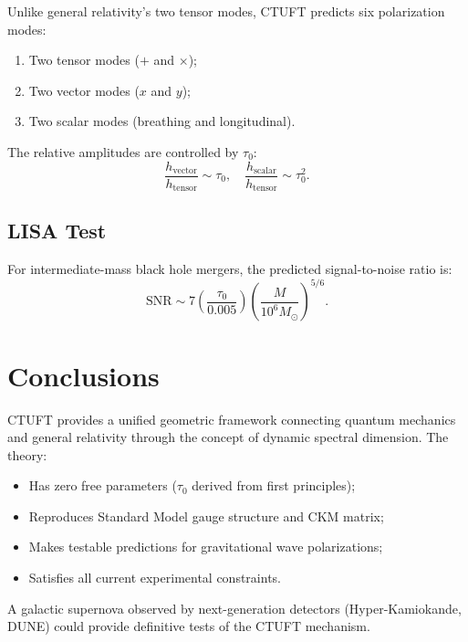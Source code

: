\documentclass[aps,prd,reprint,superscriptaddress,amsmath,amssymb]{revtex4-2}
\begin{document}
Unlike general relativity's two tensor modes, CTUFT predicts six polarization modes:
\begin{enumerate}
    \item Two tensor modes ($+$ and $\times$);
    \item Two vector modes ($x$ and $y$);
    \item Two scalar modes (breathing and longitudinal).
\end{enumerate}

The relative amplitudes are controlled by $\tau_0$:
\begin{equation}
    \frac{h_{\text{vector}}}{h_{\text{tensor}}} \sim \tau_0, \quad
    \frac{h_{\text{scalar}}}{h_{\text{tensor}}} \sim \tau_0^2.
\end{equation}

\subsection{LISA Test}

For intermediate-mass black hole mergers, the predicted signal-to-noise ratio is:
\begin{equation}
    \text{SNR} \sim 7 \left(\frac{\tau_0}{0.005}\right) \left(\frac{M}{10^6 M_\odot}\right)^{5/6}.
\end{equation}

\section{Conclusions}
\label{sec:conclusions}

CTUFT provides a unified geometric framework connecting quantum mechanics and general relativity through the concept of dynamic spectral dimension. The theory:
\begin{itemize}
    \item Has zero free parameters ($\tau_0$ derived from first principles);
    \item Reproduces Standard Model gauge structure and CKM matrix;
    \item Makes testable predictions for gravitational wave polarizations;
    \item Satisfies all current experimental constraints.
\end{itemize}

A galactic supernova observed by next-generation detectors (Hyper-Kamiokande, DUNE) could provide definitive tests of the CTUFT mechanism.
\end{document}
